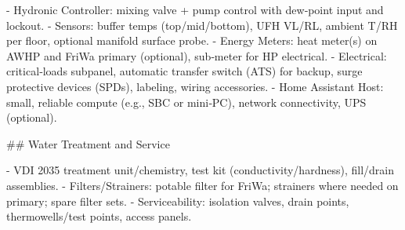\documentclass[11pt,oneside]{report}
\begin{document}
\begin{markdown}
- Hydronic Controller: mixing valve + pump control with dew‑point input and lockout.
- Sensors: buffer temps (top/mid/bottom), UFH VL/RL, ambient T/RH per floor, optional manifold surface probe.
- Energy Meters: heat meter(s) on AWHP and FriWa primary (optional), sub‑meter for HP electrical.
- Electrical: critical‑loads subpanel, automatic transfer switch (ATS) for backup, surge protective devices (SPDs), labeling, wiring accessories.
- Home Assistant Host: small, reliable compute (e.g., SBC or mini‑PC), network connectivity, UPS (optional).

## Water Treatment and Service

- VDI 2035 treatment unit/chemistry, test kit (conductivity/hardness), fill/drain assemblies.
- Filters/Strainers: potable filter for FriWa; strainers where needed on primary; spare filter sets.
- Serviceability: isolation valves, drain points, thermowells/test points, access panels.
\end{markdown}
\end{document}
